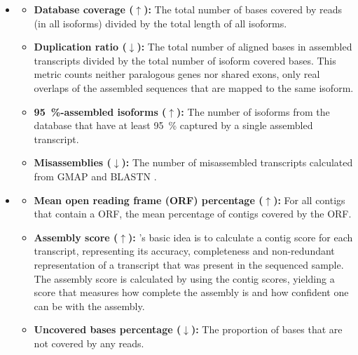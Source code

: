 \documentclass[12pt,a4paper,english]{article}
\begin{document}
		\begin{itemize}
			\item \textbf{\rnaquast} \citep{rnaQUAST:16}
				\begin{itemize}
					\item \textbf{Database coverage ($\uparrow$):} The total number of bases covered by reads (in all isoforms) divided by the total length of all isoforms. 
					\item \textbf{Duplication ratio ($\downarrow$):} The total number of aligned bases in assembled transcripts divided by the total number of isoform covered bases. This metric counts neither paralogous genes nor shared exons, only real overlaps of the assembled sequences that are mapped to the same isoform.
					\item \textbf{95~\%-assembled isoforms ($\uparrow$):} The number of isoforms from the database that have at least 95~\% captured by a single assembled transcript.
					\item \textbf{Misassemblies ($\downarrow$):} The number of misassembled transcripts calculated from GMAP \citep{gmap:05} and BLASTN \citep{blast:90}.
				\end{itemize}
			\item \textbf{\transrate} \citep{TransRate:16}
				\begin{itemize}
					\item \textbf{Mean open reading frame (ORF) percentage ($\uparrow$):} For all contigs that contain a ORF, the mean percentage of contigs covered by the ORF.
					\item \textbf{Assembly score ($\uparrow$):} \transrate'{s} basic idea is to calculate a contig score for each transcript, representing its accuracy, completeness and non-redundant representation of a transcript that was present in the sequenced sample. The assembly score is calculated by using the contig scores, yielding a score that measures how complete the assembly is and how confident one can be with the assembly.
					\item \textbf{Uncovered bases percentage ($\downarrow$):} The proportion of bases that are not covered by any reads.
				\end{itemize}
		

\end{itemize}
\end{document}
